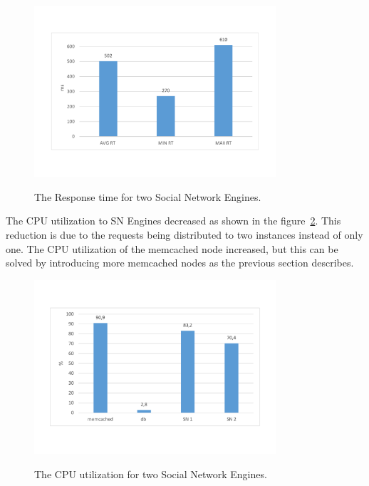 \begin{figure}[h]
	\caption{The Response time for two Social Network Engines.}
	\includegraphics[width=0.8\textwidth,natwidth=200,natheight=150]{./fig/RT2SN.pdf}
	\centering
	\label{fig:rt2SN}
\end{figure}

The CPU utilization to SN Engines decreased as shown in the figure~\ref{fig:cpu2SNavg}. This reduction is due to the requests being distributed to two instances instead of only one. The CPU utilization of the memcached node increased, but this can be solved by introducing more memcached nodes as the previous section describes. 

\begin{figure}[h]
	\caption{The CPU utilization for two Social Network Engines.}
	\includegraphics[width=0.8\textwidth,natwidth=200,natheight=150]{./fig/Usage2SN.pdf}
	\centering
	\label{fig:cpu2SNavg}
\end{figure}

